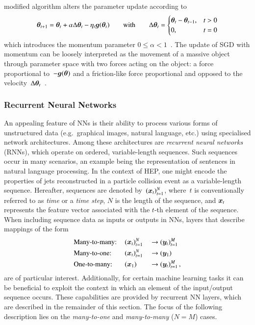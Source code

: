modified algorithm alters the parameter update according to
\begin{align*}
  \bm{\theta}_{t + 1} = \bm{\theta}_{t}
  + \alpha \Delta\bm{\theta}_{t} - \eta_t \bm{g}(\bm{\theta}_{t})
  \qquad \text{with} \qquad
  \Delta\bm{\theta}_{t} =
  \begin{cases}
    \bm{\theta}_{t} - \bm{\theta}_{t - 1}, & t > 0 \\
    0,                                         & t = 0
  \end{cases}
\end{align*}
which introduces the momentum parameter
$0 \leq \alpha < 1$~\cite{rumelhart1986learning,Goodfellow-et-al-2016}. The
update of SGD with momentum can be loosely interpreted as the movement of a
massive object through parameter space with two forces acting on the object: a
force proportional to~$-\bm{g}(\bm{\theta})$ and a friction-like force
proportional and opposed to the
velocity~$\Delta\bm{\theta}_{t}$~\cite{Goodfellow-et-al-2016}.


\subsubsection{Recurrent Neural Networks}%
\label{sec:rnn}

An appealing feature of NNs is their ability to process various forms of
unstructured data (e.g.~graphical images, natural language, etc.) using
specialised network architectures. Among these architectures are \emph{recurrent
  neural networks} (RNNs), which operate on ordered, variable-length
sequences. Such sequences occur in many scenarios, an example being the
representation of sentences in natural language processing. In the context of
HEP, one might encode the properties of jets reconstructed in a particle
collision event as a variable-length sequence. Hereafter, sequences are denoted
by~$(\bm{x}_{t})_{t = 1}^{N}$, where~$t$ is conventionally referred to as
\emph{time} or a \emph{time step}, $N$ is the length of the sequence, and
$\bm{x}_{t}$ represents the feature vector associated with the $t$-th element
of the sequence. When including sequence data as inputs or outputs in NNs,
layers that describe mappings of the form
\begin{alignat*}{3}
  &\text{Many-to-many:}\,
  &&(\bm{x}_{t})_{t = 1}^{N} &&\rightarrow (\bm{y}_{t})_{t = 1}^{M} \\
  &\text{Many-to-one:}\,
  &&(\bm{x}_{t})_{t = 1}^{N} &&\rightarrow (\bm{y}_{1}) \\
  &\text{One-to-many:}\,
  &&(\bm{x}_1)              &&\rightarrow (\bm{y}_{t})_{t = 1}^{M} \,\text{,}
\end{alignat*}
are of particular interest. Additionally, for certain machine learning tasks it
can be beneficial to exploit the context in which an element of the input/output
sequence occurs. These capabilities are provided by recurrent NN layers, which
are described in the remainder of this section. The focus of the following
description lies on the \emph{many-to-one} and \emph{many-to-many} ($N = M$)
cases.

